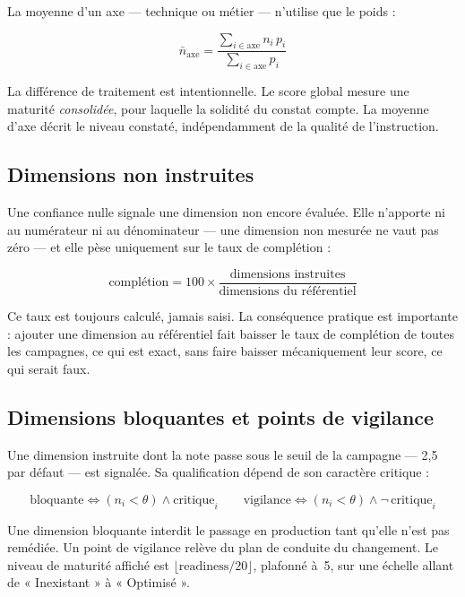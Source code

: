 La moyenne d'un axe — technique ou métier — n'utilise que le poids :

\begin{equation}
\bar{n}_{\text{axe}} =
\frac{\displaystyle\sum_{i \in \text{axe}} n_i \, p_i}{\displaystyle\sum_{i \in \text{axe}} p_i}
\label{eq:moyenne-axe}
\end{equation}

La différence de traitement est intentionnelle. Le score global mesure une maturité
\emph{consolidée}, pour laquelle la solidité du constat compte. La moyenne d'axe décrit
le niveau constaté, indépendamment de la qualité de l'instruction.

\subsection{Dimensions non instruites}

Une confiance nulle signale une dimension non encore évaluée. Elle n'apporte ni au
numérateur ni au dénominateur — une dimension non mesurée ne vaut pas zéro — et elle
pèse uniquement sur le taux de complétion :

\begin{equation}
\text{complétion} = 100 \times
\frac{\text{dimensions instruites}}{\text{dimensions du référentiel}}
\end{equation}

Ce taux est toujours calculé, jamais saisi. La conséquence pratique est importante :
ajouter une dimension au référentiel fait baisser le taux de complétion de toutes les
campagnes, ce qui est exact, sans faire baisser mécaniquement leur score, ce qui serait
faux.

\subsection{Dimensions bloquantes et points de vigilance}

Une dimension instruite dont la note passe sous le seuil de la campagne — 2,5 par
défaut — est signalée. Sa qualification dépend de son caractère critique :

\begin{equation}
\text{bloquante} \iff (n_i < \theta) \wedge \text{critique}_i
\qquad
\text{vigilance} \iff (n_i < \theta) \wedge \neg\,\text{critique}_i
\end{equation}

Une dimension bloquante interdit le passage en production tant qu'elle n'est pas
remédiée. Un point de vigilance relève du plan de conduite du changement. Le niveau de
maturité affiché est $\lfloor \text{readiness} / 20 \rfloor$, plafonné à~5, sur une
échelle allant de « Inexistant » à « Optimisé ».

